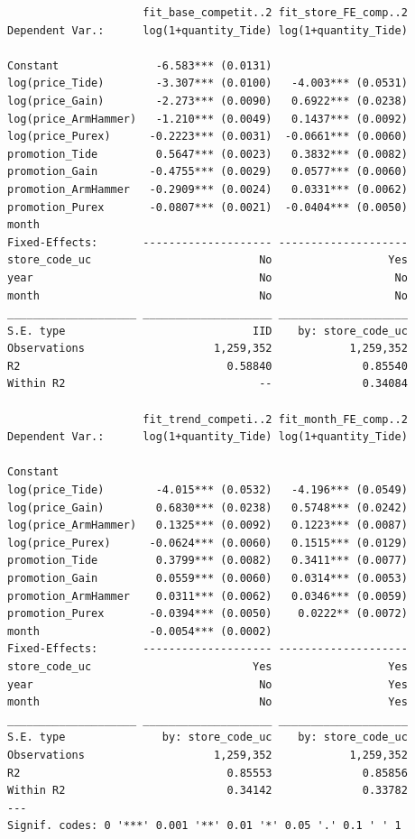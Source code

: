 \documentclass[
]{article}
\begin{document}
\begin{verbatim}
                     fit_base_competit..2 fit_store_FE_comp..2
Dependent Var.:      log(1+quantity_Tide) log(1+quantity_Tide)
                                                              
Constant               -6.583*** (0.0131)                     
log(price_Tide)        -3.307*** (0.0100)   -4.003*** (0.0531)
log(price_Gain)        -2.273*** (0.0090)   0.6922*** (0.0238)
log(price_ArmHammer)   -1.210*** (0.0049)   0.1437*** (0.0092)
log(price_Purex)      -0.2223*** (0.0031)  -0.0661*** (0.0060)
promotion_Tide         0.5647*** (0.0023)   0.3832*** (0.0082)
promotion_Gain        -0.4755*** (0.0029)   0.0577*** (0.0060)
promotion_ArmHammer   -0.2909*** (0.0024)   0.0331*** (0.0062)
promotion_Purex       -0.0807*** (0.0021)  -0.0404*** (0.0050)
month                                                         
Fixed-Effects:       -------------------- --------------------
store_code_uc                          No                  Yes
year                                   No                   No
month                                  No                   No
____________________ ____________________ ____________________
S.E. type                             IID    by: store_code_uc
Observations                    1,259,352            1,259,352
R2                                0.58840              0.85540
Within R2                              --              0.34084

                     fit_trend_competi..2 fit_month_FE_comp..2
Dependent Var.:      log(1+quantity_Tide) log(1+quantity_Tide)
                                                              
Constant                                                      
log(price_Tide)        -4.015*** (0.0532)   -4.196*** (0.0549)
log(price_Gain)        0.6830*** (0.0238)   0.5748*** (0.0242)
log(price_ArmHammer)   0.1325*** (0.0092)   0.1223*** (0.0087)
log(price_Purex)      -0.0624*** (0.0060)   0.1515*** (0.0129)
promotion_Tide         0.3799*** (0.0082)   0.3411*** (0.0077)
promotion_Gain         0.0559*** (0.0060)   0.0314*** (0.0053)
promotion_ArmHammer    0.0311*** (0.0062)   0.0346*** (0.0059)
promotion_Purex       -0.0394*** (0.0050)    0.0222** (0.0072)
month                 -0.0054*** (0.0002)                     
Fixed-Effects:       -------------------- --------------------
store_code_uc                         Yes                  Yes
year                                   No                  Yes
month                                  No                  Yes
____________________ ____________________ ____________________
S.E. type               by: store_code_uc    by: store_code_uc
Observations                    1,259,352            1,259,352
R2                                0.85553              0.85856
Within R2                         0.34142              0.33782
---
Signif. codes: 0 '***' 0.001 '**' 0.01 '*' 0.05 '.' 0.1 ' ' 1
\end{verbatim}
\end{document}
